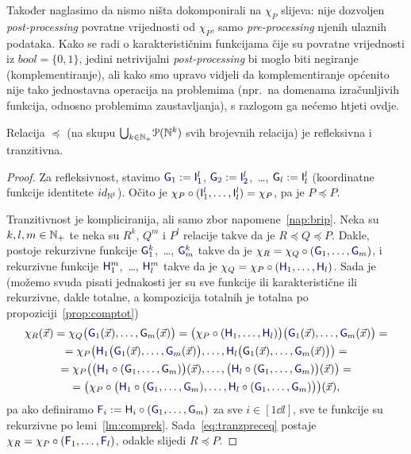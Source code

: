 Također naglasimo da nismo ništa dokomponirali na $\chi_P$ slijeva: nije dozvoljen \emph{post-processing} povratne vrijednosti od $\chi_P$, samo \emph{pre-processing} njenih ulaznih podataka. Kako se radi o karakterističnim funkcijama čije su povratne vrijednosti iz $bool=\{0,1\}$, jedini netrivijalni \emph{post-processing} bi moglo biti negiranje (komplementiranje), ali kako smo upravo vidjeli da komplementiranje općenito nije tako jednostavna operacija na problemima (npr.\ na domenama izračunljivih funkcija, odnosno problemima zaustavljanja), s razlogom ga nećemo htjeti ovdje.

\begin{propozicija}[{name=[refleksivnost i tranzitivnost svedivosti]}]\label{pp:preceqrt}
Relacija $\preceq$ (na skupu $\bigcup_{k\in{\mathbb N}_+}\!\mathcal P({\mathbb N}^k)$ svih brojevnih relacija) je refleksivna i tranzitivna.
\end{propozicija}
\begin{proof}
Za refleksivnost, stavimo $\f G_1:=\f I_1^l$, $\f G_2:=\f I_2^l$,~\ldots, $\f G_l:=\f I_l^l$ (koordinatne funkcije identitete $id_{{\mathbb N}^l}$). Očito je $\chi_P\circ(\f I_1^l,\dotsc,\f I_l^l)=\chi_P$, pa je $P\preceq P$.

	Tranzitivnost je kompliciranija, ali samo zbor napomene~\ref{nap:brip}. Neka su $k,l,m\in{\mathbb N}_+$ te neka su $R^k$, $Q^m$ i $P^l$ relacije takve da je $R\preceq Q\preceq P$. Dakle, postoje rekurzivne funkcije $\f G_1^k$,~\ldots, $\f G_m^k$ takve da je $\chi_R=\chi_Q\circ(\f G_1,\dotsc,\f G_m)$, i rekurzivne funkcije $\f H_1^m$,~\ldots, $\f H_l^m$ takve da je $\chi_Q=\chi_P\circ(\f H_1,\dotsc,\f H_l)$. Sada je (možemo svuda pisati jednakosti jer su sve funkcije ili karakteristične ili rekurzivne, dakle totalne, a kompozicija totalnih je totalna po propoziciji~\ref{prop:comptot})
\begin{multline}\label{eq:tranzpreceq}
    \chi_R(\vec x)=\chi_Q\bigl(\f G_1(\vec x),\dotsc,\f G_m(\vec x)\bigr)=\bigl(\chi_P\circ(\f H_1,\dotsc,\f H_l)\bigr)\bigl(\f G_1(\vec x),\dotsc,\f G_m(\vec x)\bigr)=\\
    =\chi_P\bigl(
    \f H_1\bigl(\f G_1(\vec x),\dotsc,\f G_m(\vec x)\bigr),\dotsc,
    \f H_l\bigl(\f G_1(\vec x),\dotsc,\f G_m(\vec x)\bigr)
    \bigr)=\\
    =\chi_P\bigl(
    \bigl(\f H_1\circ(\f G_1,\dotsc,\f G_m)\bigr)(\vec x),\dotsc,
    \bigl(\f H_l\circ(\f G_1,\dotsc,\f G_m)\bigr)(\vec x)\bigr)=\\
    =\bigl(\chi_P\circ\bigl(\f H_1\circ(\f G_1,\dotsc,\f G_m),\dotsc,\f H_l\circ(\f G_1,\dotsc,\f G_m)\bigr)\bigr)(\vec x)\text,
\end{multline}
pa ako definiramo $\f F_i:=\f H_i\circ(\f G_1,\dotsc,\f G_m)$ za sve $i\in[1\dd l]$, sve te funkcije su rekurzivne po lemi~\ref{lm:comprek}. Sada~\eqref{eq:tranzpreceq} postaje $\chi_R=\chi_P\circ(\f F_1,\dotsc,\f F_l)$, odakle slijedi $R\preceq P$.
\end{proof}

